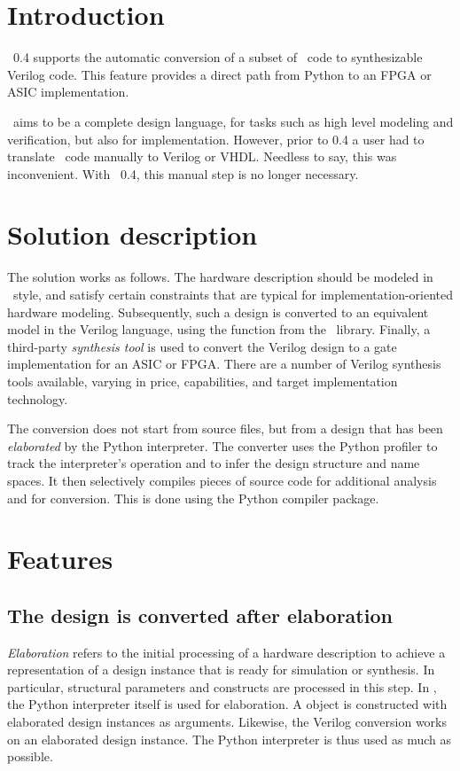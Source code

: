 \section{Introduction\label{conv-intro}}

\myhdl\ 0.4 supports the automatic conversion of a subset of \myhdl\ code
to synthesizable Verilog code. This feature provides a direct path
from Python to an FPGA or ASIC implementation.

\myhdl\ aims to be a complete design language, for tasks such as high
level modeling and verification, but also for implementation.
However, prior to 0.4 a user had to translate \myhdl\ code manually to
Verilog or VHDL. Needless to say, this was inconvenient. With \myhdl\
0.4, this manual step is no longer necessary.

\section{Solution description\label{conv-solution}}

The solution works as follows. The hardware description should be
modeled in \myhdl\ style, and satisfy certain constraints that are
typical for implementation-oriented hardware modeling.  Subsequently,
such a design is converted to an equivalent model in the Verilog
language, using the function \function{toVerilog} from the \myhdl\
library. Finally, a third-party \emph{synthesis tool} is used to
convert the Verilog design to a gate implementation for an ASIC or
FPGA. There are a number of Verilog synthesis tools available, varying
in price, capabilities, and target implementation technology.

The conversion does not start from source files, but from a design
that has been \emph{elaborated} by the Python interpreter. The
converter uses the Python profiler to track the interpreter's
operation and to infer the design structure and name spaces. It then
selectively compiles pieces of source code for additional analysis and
for conversion. This is done using the Python compiler package.

\section{Features\label{conv-features}}

\subsection{The design is converted after elaboration\label{conv-features-elab}}
\emph{Elaboration} refers to the initial processing of a hardware
description to achieve a representation of a design instance that is
ready for simulation or synthesis. In particular, structural
parameters and constructs are processed in this step. In \myhdl{}, the
Python interpreter itself is used for elaboration.  A
\class{Simulation} object is constructed with elaborated design
instances as arguments.  Likewise, the Verilog conversion works on an
elaborated design instance. The Python interpreter is thus used as
much as possible.

